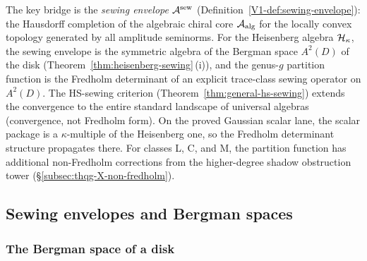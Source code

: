 The key bridge is the \emph{sewing envelope}
$\mathcal{A}^{\mathrm{sew}}$
(Definition~\ref{V1-def:sewing-envelope}): the Hausdorff completion
of the algebraic chiral core $\mathcal{A}_{\mathrm{alg}}$ for the locally convex
topology generated by all amplitude seminorms. For the Heisenberg
algebra $\mathcal{H}_\kappa$, the sewing envelope is the symmetric algebra
of the Bergman space $A^2(D)$ of the disk
(Theorem~\ref{thm:heisenberg-sewing}\,(i)), and the genus-$g$
partition function is the Fredholm determinant of an explicit
trace-class sewing operator on $A^2(D)$. The HS-sewing criterion
(Theorem~\ref{thm:general-hs-sewing}) extends the convergence to
the entire standard landscape of universal algebras (convergence,
not Fredholm
form). On the proved Gaussian scalar lane, the scalar package is
a $\kappa$-multiple of the Heisenberg one, so the Fredholm
determinant structure propagates there. For classes L, C, and M,
the partition function has additional non-Fredholm corrections
from the higher-degree shadow obstruction tower
(\S\ref{subsec:thqg-X-non-fredholm}).


%
%

\subsection{Sewing envelopes and Bergman spaces}

\subsubsection{The Bergman space of a disk}

